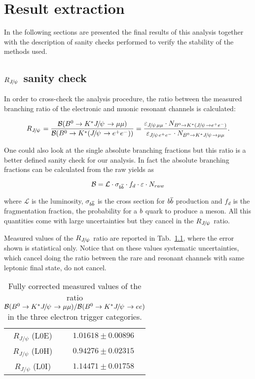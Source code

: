 \chapter{Result extraction}
\label{sec:RKst_result}

In the following sections are presented the final results of this analysis
together with the description of sanity checks performed to verify the stability
of the methods used.

\section{$R_{\jpsi}$ sanity check}

In order to cross-check the analysis procedure, the ratio between the
measured branching ratio of the electronic and muonic resonant channels is calculated:

\begin{equation}
R_{\jpsi} = \frac{\BR(\Bz\to\Kstar\jpsi\to \mu\mu)} {\BR(\Bz\to\Kstar(\jpsi\to \ee))} 
= \frac{\varepsilon_{\jpsi \mu\mu} \cdot N_{\Bz\to\Kstar(\jpsi\to \ee)}}{\varepsilon_{\jpsi \ee} 
\cdot N_{\Bz\to\Kstar\jpsi\to \mu\mu}}.
\end{equation}

One could also look at the single absolute branching fractions but this ratio
is a better defined sanity check for our analysis. In fact the absolute branching fractions
can be calculated from the raw yields as

\begin{equation}
{\ensuremath{\cal B}} = \mathcal{L} \cdot \sigma_{{b}{\overline {{b}}}} \cdot f_d \cdot \varepsilon \cdot N_{raw}
\end{equation}

where $\mathcal{L}$ is the luminosity, $\sigma_{{b}{\overline {{b}}}}$ is the cross
section for ${b}{\overline {{b}}}$ production and $f_d$ is the fragmentation fraction,
the probability for a ${b}$ quark to produce a \Bz meson.
All this quantities come with large uncertainties but they cancel in the $R_{\jpsi}$ ratio.

Measured values of the $R_{\jpsi}$ ratio are reported in Tab.~\ref{tab:Rjpsi}, where
the error shown is statistical only. Notice that on these values systematic uncertainties,
which cancel doing the ratio between the rare and resonant channels with same leptonic
final state, do not cancel.

\begin{table}[h!]
\centering
\begin{tabular}{c|c}

$R_{J/\psi}$ (L0E) 	& $ 1.01618  \pm  0.00896 $ \\
$R_{J/\psi}$ (L0H) 	& $ 0.94276  \pm  0.02315 $ \\
$R_{J/\psi}$ (L0I) 	& $ 1.14471  \pm  0.01758 $ \\
  \end{tabular}
 \caption{Fully corrected measured values of the ratio
 $\BR(\Bz\to\Kstar\jpsi\to \mu\mu) / \BR(\Bz\to\Kstar\jpsi\to ee)$
 in the three electron trigger categories. }
 \label{tab:Rjpsi}
\end{table}

